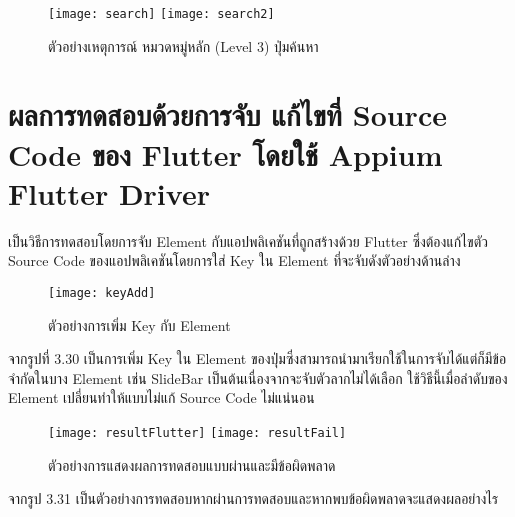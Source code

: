     \begin{figure}[H]
        \centering
        \texttt{[image: search]}
        \texttt{[image: search2]}
        \caption{ตัวอย่างเหตุการณ์ หมวดหมู่หลัก (Level 3) ปุ่มค้นหา}
        \label{Fig:60}
    \end{figure}

\section{ผลการทดสอบด้วยการจับ แก้ไขที่ Source Code ของ Flutter โดยใช้ Appium Flutter Driver}
เป็นวิธีการทดสอบโดยการจับ Element กับแอปพลิเคชันที่ถูกสร้างด้วย Flutter ซึ่งต้องแก้ไขตัว Source Code ของแอปพลิเคชันโดยการใส่ Key ใน Element ที่จะจับดังตัวอย่างด้านล่าง 
\begin{figure}[H]
    \centering
    \texttt{[image: keyAdd]}
    \caption{ตัวอย่างการเพิ่ม Key กับ Element}\label{keyAdd}
\end{figure}

จากรูปที่ 3.30 เป็นการเพิ่ม Key ใน Element ของปุ่มซึ่งสามารถนำมาเรียกใช้ในการจับได้แต่ก็มีข้อจำกัดในบาง Element เช่น SlideBar เป็นต้นเนื่องจากจะจับตัวลากไม่ได้เลือก
 ใช้วิธีนี้เมื่อลำดับของ Element เปลี่ยนทำให้แบบไม่แก้ Source Code ไม่แน่นอน

\begin{figure}[H]
    \centering
    \texttt{[image: resultFlutter]}
    \texttt{[image: resultFail]}
    \caption{ตัวอย่างการแสดงผลการทดสอบแบบผ่านและมีข้อผิดพลาด}\label{keyAdd1}
\end{figure}

จากรูป 3.31 เป็นตัวอย่างการทดสอบหากผ่านการทดสอบและหากพบข้อผิดพลาดจะแสดงผลอย่างไร

